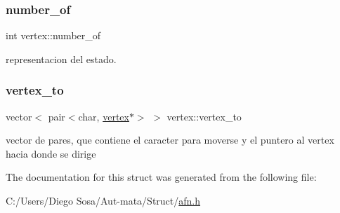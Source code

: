 \subsubsection{\texorpdfstring{number\+\_\+of}{number\_of}}
{\footnotesize\ttfamily int vertex\+::number\+\_\+of}

representacion del estado. \hypertarget{structvertex_af4c8458ab477f8d174bd3764611f18f6}{}\label{structvertex_af4c8458ab477f8d174bd3764611f18f6} 
\subsubsection{\texorpdfstring{vertex\+\_\+to}{vertex\_to}}
{\footnotesize\ttfamily vector$<$ pair$<$char, \hyperlink{structvertex}{vertex}$\ast$$>$ $>$ vertex\+::vertex\+\_\+to}

vector de pares, que contiene el caracter para moverse y el puntero al vertex hacia donde se dirige 

The documentation for this struct was generated from the following file\+:\begin{DoxyCompactItemize}
\item 
C\+:/\+Users/\+Diego Sosa/\+Aut-\/mata/\+Struct/\hyperlink{afn_8h}{afn.\+h}\end{DoxyCompactItemize}
